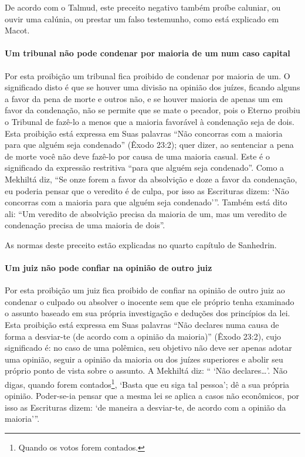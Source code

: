 De acordo com o Talmud, este preceito negativo também proíbe caluniar,
ou ouvir uma calúnia, ou prestar um falso testemunho, como está
explicado em Macot.

\paragraph{Um tribunal não pode condenar por maioria de um num caso capital}

Por esta proibição um tribunal fica proibido de condenar por maioria de
um. O significado disto é que se houver uma divisão na opinião dos
juízes, ficando alguns a favor da pena de morte e outros não, e se
houver maioria de apenas um em favor da condenação, não se permite que
se mate o pecador, pois o Eterno proibiu o Tribunal de fazê-lo a menos
que a maioria favorável à condenação seja de dois. Esta proibição está
expressa em Suas palavras ``Não concorras com a maioria para que alguém
seja condenado'' (Êxodo 23:2); quer dizer, ao sentenciar a pena de morte
você não deve fazê-lo por causa de uma maioria casual. Este é o
significado da expressão restritiva ``para que alguém seja condenado''.
Como a Mekhiltá diz, ``Se onze forem a favor da absolvição e doze a
favor da condenação, eu poderia pensar que o veredito é de culpa, por
isso as Escrituras dizem: `Não concorras com a maioria para que alguém
seja condenado'''. Também está dito ali: ``Um veredito de absolvição
precisa da maioria de um, mas um veredito de condenação precisa de uma
maioria de dois''.

As normas deste preceito estão explicadas no quarto capítulo de Sanhedrin.

\paragraph{Um juiz não pode confiar na opinião de outro juiz}

Por esta proibição um juiz fica proibido de confiar na opinião de outro
juiz ao condenar o culpado ou absolver o inocente sem que ele próprio
tenha examinado o assunto baseado em sua própria investigação e deduções
dos princípios da lei. Esta proibição está expressa em Suas palavras
``Não declares numa causa de forma a desviar-te (de acordo com a
opinião da maioria)'' (Êxodo 23:2), cujo significado é: no caso de uma
polêmica, seu objetivo não deve ser apenas adotar uma opinião, seguir a
opinião da maioria ou dos juízes superiores e abolir seu próprio ponto
de vista sobre o assunto. A Mekhiltá diz: `` `Não declares\ldots{}'. Não
digas, quando forem contados\footnote{Quando os votos forem contados.}, `Basta que eu siga tal pessoa'; dê a sua própria opinião. Poder-se-ia pensar que a mesma
lei se aplica a casos não econômicos, por isso as Escrituras dizem: `de
maneira a desviar-te, de acordo com a opinião da maioria'''.

